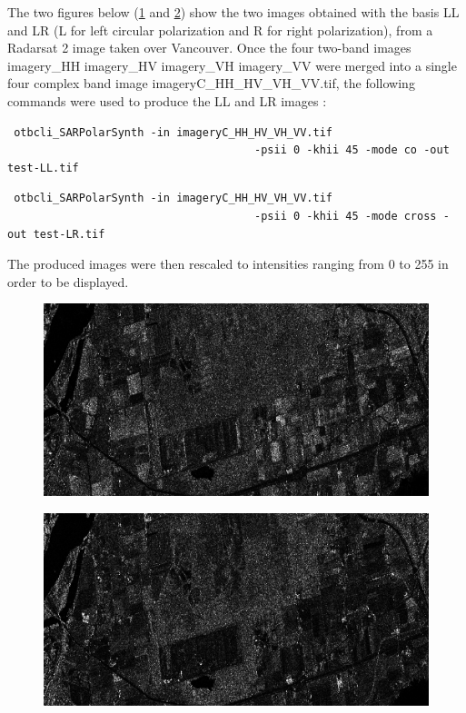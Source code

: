 The two figures below (\ref{fig:polsynthll} and \ref{fig:polsynthlr}) show the two images obtained with the basis LL and LR (L for left circular polarization and R for right polarization),
from a Radarsat 2 image taken over Vancouver. Once the four two-band images imagery\_HH imagery\_HV imagery\_VH imagery\_VV were merged 
into a single four complex band image imageryC\_HH\_HV\_VH\_VV.tif, the following commands were used to produce the LL and LR images :

\begin{verbatim} otbcli_SARPolarSynth -in imageryC_HH_HV_VH_VV.tif 
									  -psii 0 -khii 45 -mode co -out test-LL.tif \end{verbatim}
\begin{verbatim} otbcli_SARPolarSynth -in imageryC_HH_HV_VH_VV.tif 
									  -psii 0 -khii 45 -mode cross -out test-LR.tif \end{verbatim}

The produced images were then rescaled to intensities ranging from 0 to 255 in order to be displayed.


\begin{center}
  \begin{figure}[h]
    \includegraphics[width=\textwidth]{../Art/test-left-co-2.png}
    \label{fig:polsynthll}
   \end{figure}
   
   \begin{figure}[h]
    \includegraphics[width=\textwidth]{../Art/test-left-cross-2.png}
    \label{fig:polsynthlr}
   \end{figure}
\end{center}
